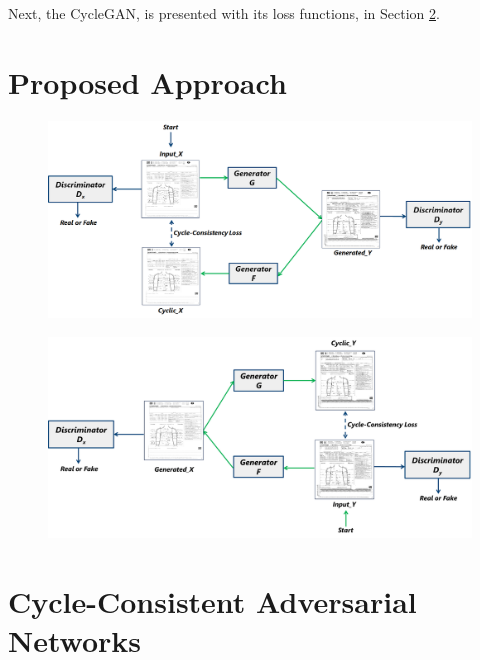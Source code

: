 \justifying
\setlength{\parskip}{1em}

 Next, the \ac{CycleGAN}, is presented with its loss functions, in Section \ref{CycleConsistentAdversarialNetworks}.

\section{Proposed Approach}\label{ProposedApproach}



\begin{figure}[H]
        \begin{center}
    	\includegraphics[scale=0.35]{images/Gxy.png}
	    \caption[]{}
	    \label{fig:Gxy}
	    \end{center}
\end{figure}



\begin{figure}[H]
        \begin{center}
    	\includegraphics[scale=0.23]{images/Fyx.png}
	    \caption[]{}
	    \label{fig:Fyx}
	    \end{center}
\end{figure}


\section{Cycle-Consistent Adversarial Networks}\label{CycleConsistentAdversarialNetworks}


